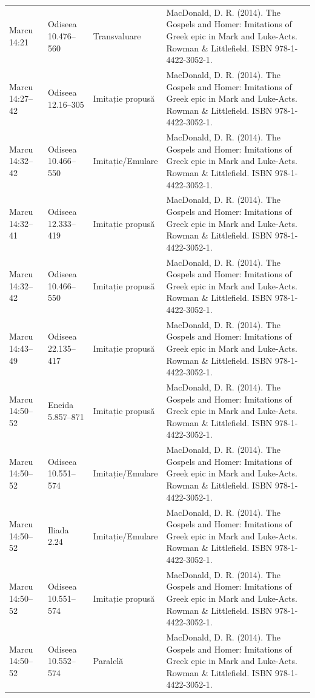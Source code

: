 \documentclass[12pt,a4paper,twoside,openany]{book}
\begin{document}
\begin{longtable}{L{1.4cm}L{1.7cm}L{3.1cm}L{8.4cm}}
Marcu 14:21 & Odiseea 10.476–560 & Transvaluare & MacDonald, D. R. (2014). The Gospels and Homer: Imitations of Greek epic in Mark and Luke-Acts. Rowman \& Littlefield. ISBN 978-1-4422-3052-1. \\
Marcu 14:27–42 & Odiseea 12.16–305 & Imitație propusă & MacDonald, D. R. (2014). The Gospels and Homer: Imitations of Greek epic in Mark and Luke-Acts. Rowman \& Littlefield. ISBN 978-1-4422-3052-1. \\
Marcu 14:32–42 & Odiseea 10.466–550 & Imitație/Emulare & MacDonald, D. R. (2014). The Gospels and Homer: Imitations of Greek epic in Mark and Luke-Acts. Rowman \& Littlefield. ISBN 978-1-4422-3052-1. \\
Marcu 14:32–41 & Odiseea 12.333–419 & Imitație propusă & MacDonald, D. R. (2014). The Gospels and Homer: Imitations of Greek epic in Mark and Luke-Acts. Rowman \& Littlefield. ISBN 978-1-4422-3052-1. \\
Marcu 14:32–42 & Odiseea 10.466–550 & Imitație propusă & MacDonald, D. R. (2014). The Gospels and Homer: Imitations of Greek epic in Mark and Luke-Acts. Rowman \& Littlefield. ISBN 978-1-4422-3052-1. \\
Marcu 14:43–49 & Odiseea 22.135–417 & Imitație propusă & MacDonald, D. R. (2014). The Gospels and Homer: Imitations of Greek epic in Mark and Luke-Acts. Rowman \& Littlefield. ISBN 978-1-4422-3052-1. \\
Marcu 14:50–52 & Eneida 5.857–871 & Imitație propusă & MacDonald, D. R. (2014). The Gospels and Homer: Imitations of Greek epic in Mark and Luke-Acts. Rowman \& Littlefield. ISBN 978-1-4422-3052-1. \\
Marcu 14:50–52 & Odiseea 10.551–574 & Imitație/Emulare & MacDonald, D. R. (2014). The Gospels and Homer: Imitations of Greek epic in Mark and Luke-Acts. Rowman \& Littlefield. ISBN 978-1-4422-3052-1. \\
Marcu 14:50–52 & Iliada 2.24 & Imitație/Emulare & MacDonald, D. R. (2014). The Gospels and Homer: Imitations of Greek epic in Mark and Luke-Acts. Rowman \& Littlefield. ISBN 978-1-4422-3052-1. \\
Marcu 14:50–52 & Odiseea 10.551–574 & Imitație propusă & MacDonald, D. R. (2014). The Gospels and Homer: Imitations of Greek epic in Mark and Luke-Acts. Rowman \& Littlefield. ISBN 978-1-4422-3052-1. \\
Marcu 14:50–52 & Odiseea 10.552–574 & Paralelă & MacDonald, D. R. (2014). The Gospels and Homer: Imitations of Greek epic in Mark and Luke-Acts. Rowman \& Littlefield. ISBN 978-1-4422-3052-1. \\

\end{longtable}
\end{document}
